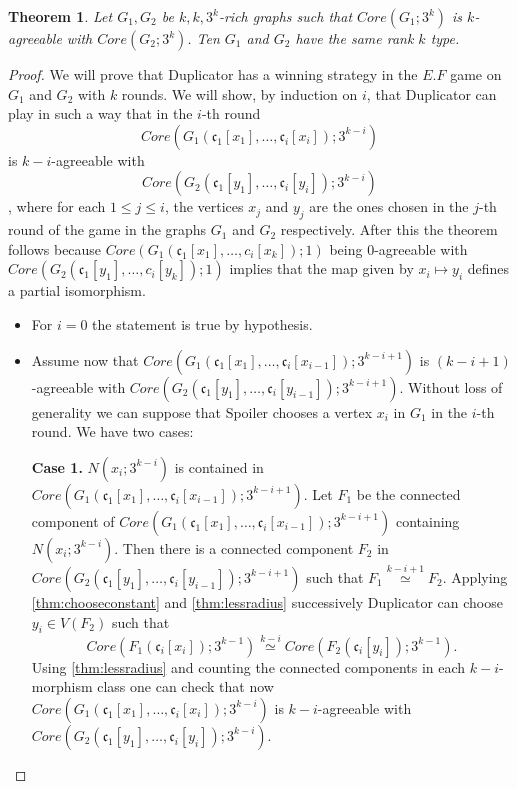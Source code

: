 \documentclass[11pt,notitlepage]{report}
\newtheorem{theorem}{Theorem}[chapter]
\theoremstyle{definition}
\newcommand{\cc}{\mathfrak{c}}
\newcommand{\morph}[1]{\stackrel{#1}{\simeq}}
\begin{document}
\begin{theorem} 
	Let $G_1, G_2$ be $k,k,3^k$-rich graphs such that $Core(G_1;3^k)$ is $k$-agreeable
	with $Core(G_2;3^k)$. Ten $G_1$ and $G_2$ have the same rank $k$ type.
\end{theorem}
\begin{proof}
	We will prove that Duplicator has a winning strategy in 
	the $E.F$ game on $G_1$ and $G_2$ with $k$ rounds. 
	We will show, by induction on $i$, that Duplicator can play in such a way
	that in the $i$-th round
	\[Core(G_1(\cc_1[x_1],\dots,\cc_i[x_i]);3^{k-i}) \]
	is $k-i$-agreeable with  
	\[ Core(G_2(\cc_1[y_1],\dots,\cc_i[y_i]);3^{k-i}) \],
	where for each $1\leq j \leq i$, the vertices
	$x_j$ and $y_j$ are the ones chosen in the $j$-th 
	round of the game in the graphs $G_1$ and $G_2$ respectively. 
	After this the theorem
	follows because
	$Core(G_1(\cc_1[x_1],\dots,c_i[x_k]);1)$ being $0$-agreeable with
	$Core(G_2(\cc_1[y_1],\dots,c_i[y_k]);1)$ implies that
	the map given by $x_i\mapsto y_i$ defines a partial isomorphism. \par
	\begin{itemize}[leftmargin=*]
		\item For $i=0$ the statement is true by hypothesis. 
		\item Assume now that $Core(G_1(\cc_1[x_1],\dots,\cc_i[x_{i-1}]);3^{k-i+1})$
		is $(k-i+1)$-agreeable with $Core(G_2(\cc_1[y_1],\dots, \cc_i[y_{i-1}]); 3^{k-i+1})$.
		Without loss of generality we can suppose that Spoiler chooses a vertex 
		$x_i$ in $G_1$ in the $i$-th round. We have two cases: \par
		\textbf{Case 1.} $N(x_i;3^{k-i})$ is contained in 
			$Core(G_1(\cc_1[x_1],\dots,\cc_i[x_{i-1}]);3^{k-i+1})$.
			Let $F_1$ be the connected component of 
			$Core(G_1(\cc_1[x_1],\dots,\cc_i[x_{i-1}]);3^{k-i+1})$
			containing $N(x_i;3^{k-i})$. Then there is a connected component $F_2$
			in \\ 
			$Core(G_2(\cc_1[y_1],\dots,\cc_i[y_{i-1}]);3^{k-i+1})$ such that
			$F_1 \morph{k-i+1} F_2$. Applying \cref{thm:chooseconstant} and 
			\cref{thm:lessradius} successively Duplicator can choose
			$y_i\in V(F_2)$ such that 
			\[ Core(F_1(\cc_i[x_i]); 3^{k-1})\morph{k-i} Core(F_2(\cc_i[y_i]); 3^{k-1}).\]
			Using \cref{thm:lessradius} 
			and counting the connected components in each $k-i$-morphism class
			one can check that now $Core(G_1(\cc_1[x_1],\dots,\cc_i[x_i]);3^{k-i})$
			is $k-i$-agreeable with  $Core(G_2(\cc_1[y_1],\dots,\cc_i[y_i]);3^{k-i})$.
			\par

\end{itemize}
\end{proof}
\end{document}
